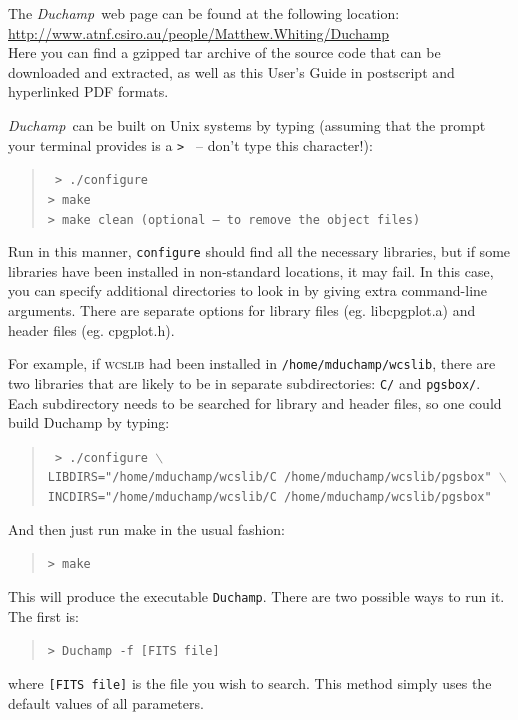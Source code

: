 \documentclass[12pt,a4paper]{article}
\newcommand{\duchamp}{\emph{Duchamp}}
\begin{document}
The \duchamp\ web page can be found at the following location:\\
\href{http://www.atnf.csiro.au/people/Matthew.Whiting/Duchamp}%
{http://www.atnf.csiro.au/people/Matthew.Whiting/Duchamp}\\
Here you can find a gzipped tar archive of the source code that can be
downloaded and extracted, as well as this User's Guide in postscript
and hyperlinked PDF formats.

\duchamp\ can be built on Unix systems by typing (assuming that the
prompt your terminal provides is a \texttt{> } -- don't type this
character!):
\begin{quote}
\texttt{%
> ./configure\\
> make\\
> make clean (optional -- to remove the object files)}
\end{quote}

Run in this manner, \texttt{configure} should find all the necessary
libraries, but if some libraries have been installed in non-standard
locations, it may fail. In this case, you can specify additional
directories to look in by giving extra command-line arguments. There
are separate options for library files (eg. libcpgplot.a) and header
files (eg. cpgplot.h).

For example, if \textsc{wcslib} had been installed in
\texttt{/home/mduchamp/wcslib}, there are two libraries that are
likely to be in separate subdirectories: \texttt{C/} and
\texttt{pgsbox/}. Each subdirectory needs to be searched for library
and header files, so one could build Duchamp by typing: 
\begin{quote}
\texttt{%
>  ./configure $\backslash$ \\ 
LIBDIRS="/home/mduchamp/wcslib/C /home/mduchamp/wcslib/pgsbox" 
$\backslash$\\
INCDIRS="/home/mduchamp/wcslib/C /home/mduchamp/wcslib/pgsbox"}
\end{quote}
And then just run make in the usual fashion:
\begin{quote}
\texttt{> make}
\end{quote}

This will produce the executable \texttt{Duchamp}. There are two
possible ways to run it. The first is:
\begin{quote}
\texttt{> Duchamp -f [FITS file]}
\end{quote}
where \texttt{[FITS file]} is the file you wish to search. This method
simply uses the default values of all parameters.
\end{document}
